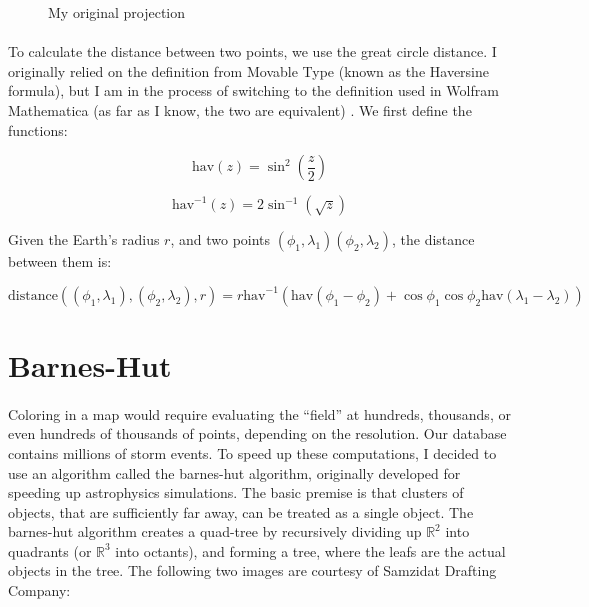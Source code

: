 \documentclass[a4paper]{article}
\begin{document}
\begin{figure}[H]
\centering
\caption{My original projection}
\end{figure}




\paragraph{} To calculate the distance between two points, we use the great circle distance. I originally relied on the definition from Movable Type (known as the Haversine formula)\cite{movableType}, but I am in the process of switching to the definition used in Wolfram Mathematica (as far as I know, the two are equivalent) \cite{wolframHaversine}. We first define the functions:

\begin{equation}
  \text{hav}(z) = \sin^{2}(\dfrac{z}{2})
\end{equation}

\begin{equation}
  \text{hav}^{-1}(z) = 2\sin^{-1}(\sqrt{z})
\end{equation}

Given the Earth's radius $r$, and two points $(\phi_{1}, \lambda_{1}) (\phi_{2}, \lambda_{2})$, the distance between them is:

\begin{equation}
  \label{eq:distance}
  \text{distance}((\phi_{1}, \lambda_{1}), (\phi_{2}, \lambda_{2}), r) = r \text{hav}^{-1}(\text{hav}(\phi_{1} - \phi_{2}) + \cos{\phi_{1}}\cos{\phi_{2}}\text{hav}(\lambda_{1} - \lambda_{2}))
  \end{equation}



\section{Barnes-Hut}
\paragraph{} Coloring in a map would require evaluating the ``field'' at hundreds, thousands, or even hundreds of thousands of points, depending on the resolution. Our database contains millions of storm events. To speed up these computations, I decided to use an algorithm called the barnes-hut algorithm, originally developed for speeding up astrophysics simulations. The basic premise is that clusters of objects, that are sufficiently far away, can be treated as a single object. The barnes-hut algorithm creates a quad-tree by recursively dividing up $\mathbb{R}^{2}$ into quadrants (or $\mathbb{R}^{3}$ into octants), and forming a tree, where the leafs are the actual objects in the tree. The following two images are courtesy of Samzidat Drafting Company:
\end{document}
